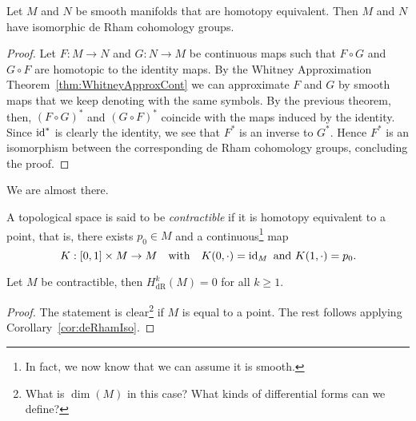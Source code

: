 \begin{corollary}\label{cor:deRhamIso}
	Let $M$ and $N$ be smooth manifolds that are homotopy equivalent. Then $M$ and $N$ have isomorphic de Rham cohomology groups.
\end{corollary}
\begin{proof}
	Let $F:M\to N$ and $G:N\to M$ be continuous maps such that $F\circ G$ and $G\circ F$ are homotopic to the identity maps.
	By the Whitney Approximation Theorem~\ref{thm:WhitneyApproxCont} we can approximate $F$ and $G$ by smooth maps that we keep denoting with the same symbols.
	By the previous theorem, then, $(F\circ G)^*$ and $(G\circ F)^*$ coincide with the maps induced by the identity.
	Since $\operatorname{id}^*$ is clearly the identity, we see that $F^*$ is an inverse to $G^*$.
	Hence $F^*$ is an isomorphism between the corresponding de Rham cohomology groups,
	concluding the proof.
\end{proof}

We are almost there.

\begin{definition}
	A topological space is said to be \emph{contractible} if it is homotopy equivalent to a point, that is, there exists $p_0\in M$ and a continuous\footnote{In fact, we now know that we can assume it is smooth.} map
	\begin{equation}
		K:[0,1]\times M \to M
		\quad\mbox{with}\quad
		K(0, \cdot) = \operatorname{id}_M
		\mbox{ and }
		K(1, \cdot) = p_0.
	\end{equation}
\end{definition}

\begin{corollary}
	Let $M$ be contractible, then $H^k_{\mathrm{dR}}(M)=0$ for all $k\geq 1$.
\end{corollary}
\begin{proof}
	The statement is clear\footnote{What is $\dim(M)$ in this case? What kinds of differential forms can we define?} if $M$ is equal to a point.
	The rest follows applying Corollary~\ref{cor:deRhamIso}.
\end{proof}

